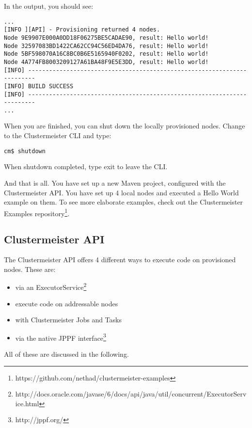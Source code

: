 In the output, you should see:

\begin{lstlisting}[breaklines=true, backgroundcolor=\color{lbcolor}]
...
[INFO ][API] - Provisioning returned 4 nodes.
Node 9E9907E000A0DD18F06275BE5CADAE90, result: Hello world!
Node 32597083BD1422CA62CC94C56ED4DA76, result: Hello world!
Node 5BF598070A16C8BC0B6E5165940F0202, result: Hello world!
Node 4A774FB8003209127A61BA48F9E5E3DD, result: Hello world!
[INFO] ------------------------------------------------------------------------
[INFO] BUILD SUCCESS
[INFO] ------------------------------------------------------------------------
...
\end{lstlisting}

When you are finished, you can shut down the locally provisioned nodes. Change to the Clustermeister CLI and type:

\begin{lstlisting}[breaklines=true, backgroundcolor=\color{lbcolor}]
cm$ shutdown
\end{lstlisting}

When shutdown completed, type exit to leave the CLI.

And that is all. You have set up a new Maven project, configured with the Clustermeister API. You have set up 4 local nodes and executed a Hello World example on them. To see more elaborate examples, check out the Clustermeister Examples repository\footnote{https://github.com/nethad/clustermeister-examples}.

\subsection{Clustermeister API}

The Clustermeister API offers 4 different ways to execute code on provisioned nodes. These are:

\begin{itemize}
 \item via an ExecutorService\footnote{http://docs.oracle.com/javase/6/docs/api/java/util/concurrent/ExecutorService.html}
 \item execute code on addressable nodes
 \item with Clustermeister Jobs and Tasks
 \item via the native JPPF interface\footnote{http://jppf.org/}
\end{itemize}

All of these are discussed in the following.

